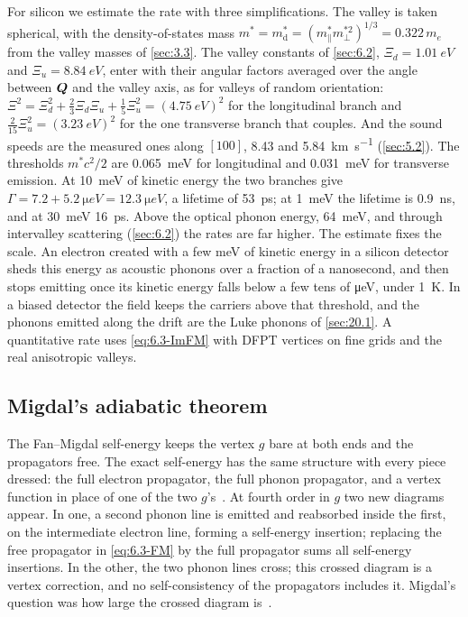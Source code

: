 For silicon we estimate the rate with three simplifications. The valley is taken spherical, with the density-of-states mass $m^* = m^*_{\mathrm{d}} = (m^*_\parallel m^{*2}_\perp)^{1/3} = 0.322\,m_e$ from the valley masses of \cref{sec:3.3}. The valley constants of \cref{sec:6.2}, $\Xi_d = \SI{1.01}{eV}$ and $\Xi_u = \SI{8.84}{eV}$, enter with their angular factors averaged over the angle between $\bm{Q}$ and the valley axis, as for valleys of random orientation: $\Xi^2 = \Xi_d^2 + \tfrac23\Xi_d\Xi_u + \tfrac15\Xi_u^2 = (\SI{4.75}{eV})^2$ for the longitudinal branch and $\tfrac{2}{15}\Xi_u^2 = (\SI{3.23}{eV})^2$ for the one transverse branch that couples. And the sound speeds are the measured ones along $[100]$, 8.43 and \SI{5.84}{km.s^{-1}} (\cref{sec:5.2}). The thresholds $m^*c^2/2$ are \SI{0.065}{meV} for longitudinal and \SI{0.031}{meV} for transverse emission. At \SI{10}{meV} of kinetic energy the two branches give $\varGamma = 7.2 + \SI{5.2}{\micro eV} = \SI{12.3}{\micro eV}$, a lifetime of \SI{53}{ps}; at \SI{1}{meV} the lifetime is \SI{0.9}{ns}, and at \SI{30}{meV} \SI{16}{ps}. Above the optical phonon energy, \SI{64}{meV}, and through intervalley scattering (\cref{sec:6.2}) the rates are far higher. The estimate fixes the scale. An electron created with a few meV of kinetic energy in a silicon detector sheds this energy as acoustic phonons over a fraction of a nanosecond, and then stops emitting once its kinetic energy falls below a few tens of \si{\micro eV}, under \SI{1}{K}. In a biased detector the field keeps the carriers above that threshold, and the phonons emitted along the drift are the Luke phonons of \cref{sec:20.1}. A quantitative rate uses \cref{eq:6.3-ImFM} with DFPT vertices on fine grids and the real anisotropic valleys.

\subsection{Migdal's adiabatic theorem}

The Fan--Migdal self-energy keeps the vertex $g$ bare at both ends and the propagators free. The exact self-energy has the same structure with every piece dressed: the full electron propagator, the full phonon propagator, and a vertex function in place of one of the two $g$'s~\cite[Eq.~(156)]{giustino2017electron}. At fourth order in $g$ two new diagrams appear. In one, a second phonon line is emitted and reabsorbed inside the first, on the intermediate electron line, forming a self-energy insertion; replacing the free propagator in \cref{eq:6.3-FM} by the full propagator sums all self-energy insertions. In the other, the two phonon lines cross; this crossed diagram is a vertex correction, and no self-consistency of the propagators includes it. Migdal's question was how large the crossed diagram is~\cite{migdal1958interaction}.

